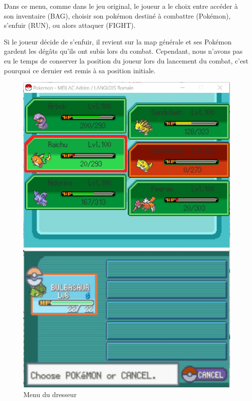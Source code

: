 Dans ce menu, comme dans le jeu original, le joueur a le choix entre accéder à son inventaire (BAG), choisir son pokémon destiné à combattre (Pokémon), s'enfuir (RUN), ou alors attaquer (FIGHT).

Si le joueur décide de s'enfuir, il revient sur la map générale et ses Pokémon gardent les dégâts qu'ils ont subis lors du combat. Cependant, nous n'avons pas eu le temps de conserver la position du joueur lors du lancement du combat, c'est pourquoi ce dernier est remis à sa position initiale. 

\begin{figure}[!h]
\begin{minipage}{0.49\textwidth}
\includegraphics[scale = 0.6]{../Images/swapMenu.jpg}
\end{minipage}
\begin{minipage}{0.49\textwidth}
\includegraphics[scale = 0.84]{../Images/vrai_jeu_swapMenu.jpg}
\end{minipage}
\caption{Menu du dresseur}
\end{figure}

